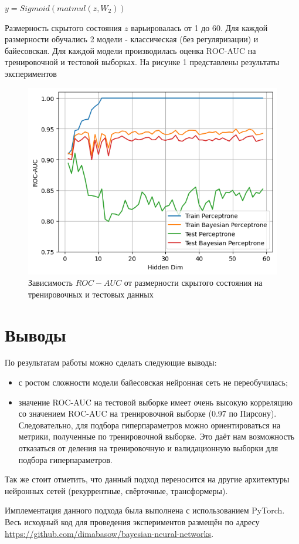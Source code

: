 \documentclass{article}
\begin{document}
$y = Sigmoid(matmul(z, W_2))$

Размерность скрытого состояния $z$ варьировалась от 1 до 60. Для каждой размерности обучались 2 модели - классическая (без регуляризации) и байесовская. Для каждой модели производилась оценка ROC-AUC на тренировочной и тестовой выборках. На рисунке 1 представлены результаты экспериментов

\begin{figure}
    \centering
    \includegraphics[width=1\linewidth]{roc_auc.png}
    \caption{Зависимость $ROC-AUC$ от размерности скрытого состояния на тренировочных и тестовых данных}
    \label{fig:enter-label}
\end{figure}

\section{Выводы}
По результатам работы можно сделать следующие выводы:
\begin{itemize}
    \item с ростом сложности модели байесовская нейронная сеть не переобучилась;
    \item значение ROC-AUC на тестовой выборке имеет очень высокую корреляцию со значением ROC-AUC на тренировочной выборке (0.97 по Пирсону). Следовательно, для подбора гиперпараметров можно ориентироваться на метрики, полученные по тренировочной выборке. Это даёт нам возможность отказаться от деления на тренировочную и валидационную выборки для подбора гиперпараметров.
\end{itemize}

Так же стоит отметить, что данный подход переносится на другие архитектуры нейронных сетей (рекуррентные, свёрточные, трансформеры).

Имплементация данного подхода была выполнена с использованием PyTorch. Весь исходный код для проведения экспериментов размещён по адресу \url{https://github.com/dimabasow/bayesian-neural-networks}.
\end{document}
